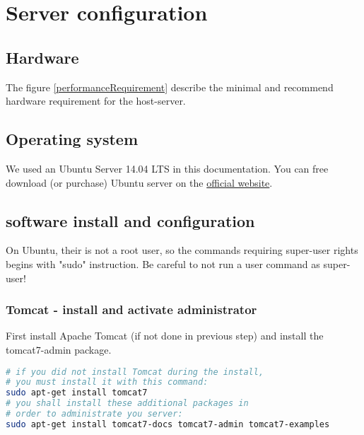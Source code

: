 \section{Server configuration}

\subsection{Hardware}
The figure \ref{performanceRequirement} describe the minimal and recommend hardware requirement for the host-server.\\



\subsection{Operating system}
We used an Ubuntu Server 14.04 LTS in this documentation.
You can free download (or purchase) Ubuntu server on the \href{http://www.ubuntu.com/download/server}{official website}.


\subsection{software install and configuration}

On Ubuntu, their is not a root user, so the commands requiring super-user rights begins with "sudo" instruction. 
Be careful to not run a user command as super-user! 

\subsubsection{Tomcat - install and activate administrator}

First install Apache Tomcat (if not done in previous step) and install the tomcat7-admin package.

\begin{lstlisting}[language=bash,caption={Install Tomcat7},frame=bt]
# if you did not install Tomcat during the install,
# you must install it with this command:
sudo apt-get install tomcat7
# you shall install these additional packages in 
# order to administrate you server:
sudo apt-get install tomcat7-docs tomcat7-admin tomcat7-examples
\end{lstlisting}


